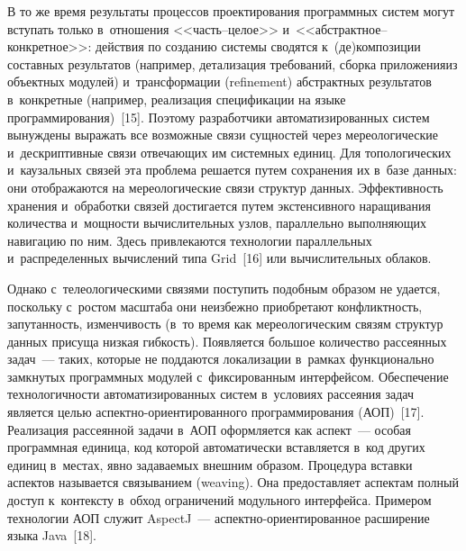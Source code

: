 \begin{multicols}{2}
   В то же время результаты процессов проектирования программных систем 
могут вступать только в~отношения <<часть--це\-лое>>  
и~<<абст\-ракт\-ное--кон\-крет\-ное>>: действия по созданию сис\-те\-мы сводятся 
к~(де)композиции составных результатов (например, детализация требований, 
сборка приложения\linebreak из объектных модулей) и~трансформации (refinement) 
абстрактных результатов в~конкретные (например, реализация спецификации 
на языке программирования)~[15]. Поэтому разработчики\linebreak
 автоматизированных 
систем вынуждены выражать все возможные связи сущностей через 
мереологические и~дескриптивные связи отвечающих им сис\-тем\-ных единиц. 
Для топологических и~каузальных связей эта проблема решается путем 
сохранения их в~базе данных: они отображаются на мереологические связи 
структур данных. Эффективность хранения и~обработки связей достигается 
путем экстенсивного наращивания количества и~мощности вычислительных 
узлов, параллельно выполняющих навигацию по ним. Здесь привлекаются 
технологии параллельных и~распределенных вычислений типа Grid~[16] или 
вычислительных облаков.
   
   Однако с~телеологическими связями поступить подобным образом не 
удается, поскольку с~ростом масштаба они неизбежно приобретают 
конфликтность, запутанность, изменчивость (в~то время как мереологическим 
связям структур данных присуща низкая гибкость). Появляется большое 
количество рассеянных задач~--- таких, которые не поддаются локализации 
в~рамках функционально замкнутых программных модулей с~фиксированным 
интерфейсом. Обеспечение технологичности автоматизированных систем 
в~условиях рассеяния задач является целью  
ас\-пект\-но-ори\-ен\-ти\-ро\-ван\-но\-го программирования (АОП)~[17]. 
Реализация рассеянной задачи в~АОП оформляется как аспект~--- особая 
программная единица, код которой автоматически вставляется в~код других 
единиц в~мес\-тах, явно задаваемых внешним образом. Процедура вставки 
аспектов называется связыванием (weaving). Она предоставляет аспектам 
полный доступ к~контексту в~обход ограничений модульного интерфейса. 
Примером технологии АОП служит AspectJ~---  
ас\-пект\-но-ори\-ен\-ти\-ро\-ван\-ное расширение языка Java~[18].
   

\end{multicols}
